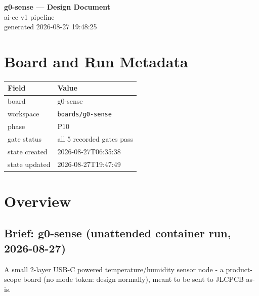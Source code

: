 \documentclass[11pt,a4paper]{article}
\begin{document}
\sloppy
\begin{center}
{\LARGE\bfseries g0-sense --- Design Document}\\[6pt]
{\large ai-ee v1 pipeline}\\[2pt]
generated 2026-08-27 19:48:25
\end{center}
\tableofcontents

\section{Board and Run Metadata}
{\small
\begin{longtable}{lp{11cm}}
\toprule
\textbf{Field} & \textbf{Value} \\
\midrule
\endhead
board & g0-sense \\
workspace & \texttt{boards/g0-sense} \\
phase & P10 \\
gate status & all 5 recorded gates pass \\
state created & 2026-08-27T06:35:38 \\
state updated & 2026-08-27T19:47:49 \\
\bottomrule
\end{longtable}
}
\section{Overview}
\subsection*{Brief: g0-sense (unattended container run, 2026-08-27)}
A small 2-layer USB-C powered temperature/humidity sensor node - a product-scope board (no mode token: design normally), meant to be sent to JLCPCB as-is.
\end{document}
